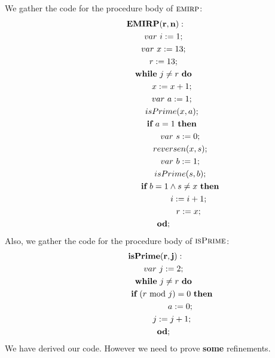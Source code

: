\documentclass[a4paper,12pt,fleqn]{scrartcl}
\newcommand{\var}{\textrm{$var$ }}
\newcommand{\emirp}{\textsc{emirp}\xspace}
\newcommand{\isPrime}{\textsc{isPrime}\xspace}
\begin{document}
We gather the code for the procedure body of $\emirp$:
\begin{gather*}
  \mathbf{EMIRP(r,n):}\\
  \qquad \var i\Ass 1;\\
  \qquad \var x\Ass 13;\\
  \qquad r\Ass 13;\\
  \qquad \WHILE~j\neq r~\DO\\
  \qquad \qquad x\Ass {x+1};\\
  \qquad \qquad \var a\Ass 1;\\
  \qquad \qquad isPrime(x,a);\\
  \qquad \qquad \IF~a=1~\THEN\\
  \qquad \qquad \qquad \var s\Ass 0;\\
  \qquad \qquad \qquad reversen(x,s);\\
  \qquad \qquad \qquad \var b\Ass 1;\\
  \qquad \qquad \qquad isPrime(s,b);\\
  \qquad \qquad \qquad \IF~b=1\And s\neq x~\THEN\\
  \qquad \qquad \qquad \qquad i\Ass {i+1};\\
  \qquad \qquad \qquad \qquad r\Ass x;\\
  \qquad \OD;
\end{gather*}
Also, we gather the code for the procedure body of $\isPrime$:
\begin{gather*}
  \mathbf{isPrime(r,j):}\\
  \qquad \var j\Ass 2;\\
  \qquad \WHILE~j\neq r~\DO\\
  \qquad \qquad \IF~(r \textrm{ mod }j)=0~\THEN\\
  \qquad \qquad \qquad a\Ass 0;\\
  \qquad \qquad j\Ass {j+1};\\
  \qquad \OD;\\
\end{gather*}
We have derived our code. However we need to prove \textbf{\color{blue}some }\color{black} refinements.
\end{document}
